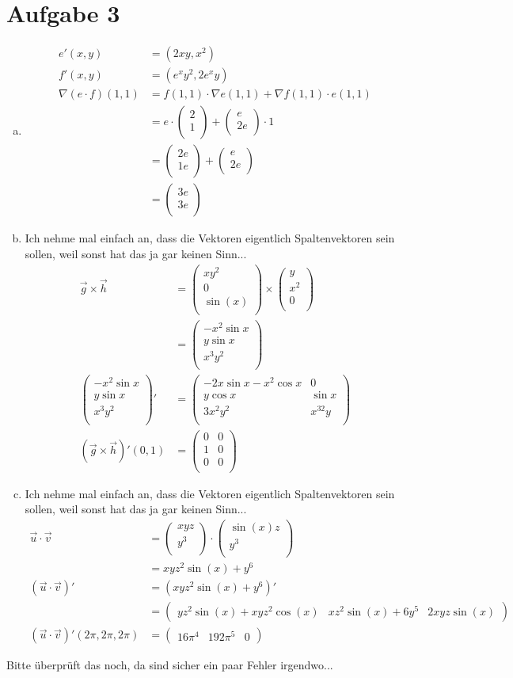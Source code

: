 \documentclass[10pt,a4paper,parskip=half]{scrartcl}
\newcommand{\vectwo}[2]{\begin{pmatrix}#1\\#2\\\end {pmatrix}}
\newcommand{\vecthree}[3]{\begin{pmatrix}#1\\#2\\#3\\\end {pmatrix}}
\begin{document}
\section*{Aufgabe 3}
\begin{enumerate}[(a)]
\item
\begin{align*}
e'(x,y) &= (2xy,x^2) \\
f'(x,y) &= (e^xy^2,2e^xy) \\
\nabla(e\cdot f)(1,1) &= f(1,1) \cdot \nabla e(1,1) + \nabla  f(1,1) \cdot e(1,1) \\
&= e \cdot \vectwo{2}{1} + \vectwo{e}{2e} \cdot 1 \\
&= \vectwo{2e}{1e} + \vectwo{e}{2e} \\
&= \vectwo{3e}{3e}
\end{align*}

\item
Ich nehme mal einfach an, dass die Vektoren eigentlich Spaltenvektoren sein sollen, weil sonst hat das ja gar keinen Sinn...
\begin{align*}
\vec g \times \vec h &= \vecthree{xy^2}{0}{\sin (x)} \times \vecthree{y}{x^2}{0} \\
&= \vecthree{-x^2 \sin x}{y\sin x}{x^3y^2} \\
\vecthree{-x^2 \sin x}{y \sin x}{x^3y^2}' &= 
\begin{pmatrix}
-2x \sin x - x^2 \cos x& 0 \\
y \cos x & \sin x \\
3x^2y^2 & x^32y\\
\end{pmatrix}\\
(\vec g \times \vec h)'(0,1) &= \begin{pmatrix}
0 & 0 \\
1 & 0 \\
0 & 0 \\
\end{pmatrix}
\end{align*}
\item
Ich nehme mal einfach an, dass die Vektoren eigentlich Spaltenvektoren sein sollen, weil sonst hat das ja gar keinen Sinn...
\begin{align*}
\vec u \cdot \vec v &= \vectwo{xyz}{y^3} \cdot \vectwo{\sin(x)z}{y^3} \\
&= xyz^2\sin(x) + y^6 \\
(\vec u \cdot \vec v)' &= (xyz^2\sin(x) + y^6)' \\
&= \begin{pmatrix}
yz^2\sin(x) + xyz^2\cos(x) & xz^2\sin(x) + 6y^5 & 2xyz\sin(x)
\end{pmatrix} \\
(\vec u \cdot \vec v)'(2\pi, 2\pi, 2\pi) &= \begin{pmatrix}16\pi^4 & 192\pi^5 & 0\end{pmatrix}
\end{align*}
\end{enumerate}
Bitte überprüft das noch, da sind sicher ein paar Fehler irgendwo...
\end{document}
